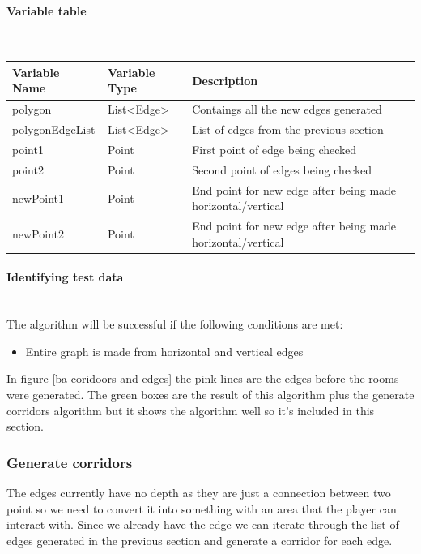 \documentclass{article}
\newcommand{\myparagraph}[1]{\paragraph{#1}\mbox{}\\} %
\newcommand{\smallBr}{\vspace{1.5mm}}
\begin{document}
\myparagraph{Variable table}
\smallBr
\begin{tabular}{l|l|l}
Variable Name   & Variable Type                     & Description                                                 \\ \hline
polygon         & List\textless{}Edge\textgreater{} & Contaings all the new edges generated                       \\
polygonEdgeList & List\textless{}Edge\textgreater{} & List of edges from the previous section                     \\
point1          & Point                             & First point of edge being checked                           \\
point2          & Point                             & Second point of edges being checked                         \\
newPoint1       & Point                             & End point for new edge after being made horizontal/vertical \\
newPoint2       & Point                             & End point for new edge after being made horizontal/vertical
\end{tabular}

\myparagraph{Identifying test data}
The algorithm will be successful if the following conditions are met:
\begin{itemize}
\item{Entire graph is made from horizontal and vertical edges}
\end{itemize}

In figure \ref{ba coridoors and edges} the pink lines are the edges before the rooms were generated. The green boxes are the result of this algorithm plus the generate corridors algorithm but it shows the algorithm well so it's included in this section.

\subsubsection{Generate corridors}
The edges currently have no depth as they are just a connection between two point so we need to convert it into something with an area that the player can interact with. Since we already have the edge we can iterate through the list of edges generated in the previous section and generate a corridor for each edge.
\end{document}

